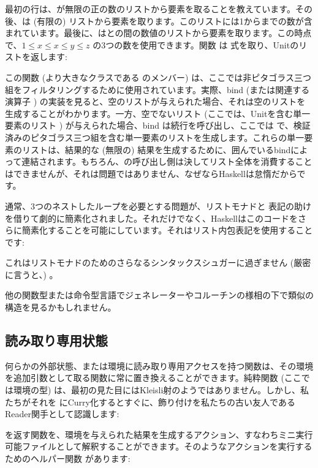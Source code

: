 最初の行は、が無限の正の数のリスト\code{{[}1..{]}}から要素を取ることを教えています。その後、は (有限の) リスト\code{{[}1..z{]}}から要素を取ります。このリストには1からまでの数が含まれています。最後に、はとの間の数値のリストから要素を取ります。この時点で、$1 \leqslant x \leqslant x \leqslant y \leqslant z$ の3つの数を使用できます。関数  は  式を取り、Unitのリストを返します: 

この関数 (より大きなクラスである  のメンバー) は、ここでは非ピタゴラス三つ組をフィルタリングするために使用されています。実際、bind (または関連する演算子 \code{>>}) の実装を見ると、空のリストが与えられた場合、それは空のリストを生成することがわかります。一方、空でないリスト (ここでは、Unitを含む単一要素のリスト \code{{[}(){]}}) が与えられた場合、bind は続行を呼び出し、ここでは  で、検証済みのピタゴラス三つ組を含む単一要素のリストを生成します。これらの単一要素のリストは、結果的な (無限の) 結果を生成するために、囲んでいるbindによって連結されます。もちろん、の呼び出し側は決してリスト全体を消費することはできませんが、それは問題ではありません、なぜならHaskellは怠惰だからです。

通常、3つのネストしたループを必要とする問題が、リストモナドと  表記の助けを借りて劇的に簡素化されました。それだけでなく、Haskellはこのコードをさらに簡素化することを可能にしています。それはリスト内包表記を使用することです: 

これはリストモナドのためのさらなるシンタックスシュガーに過ぎません (厳密に言うと、) 。

他の関数型または命令型言語でジェネレーターやコルーチンの様相の下で類似の構造を見るかもしれません。

\subsection{読み取り専用状態}

何らかの外部状態、または環境に読み取り専用アクセスを持つ関数は、その環境を追加引数として取る関数に常に置き換えることができます。純粋関数  (ここで  は環境の型) は、最初の見た目にはKleisli射のようではありません。しかし、私たちがそれを
 にCurry化するとすぐに、飾り付けを私たちの古い友人であるReader関手として認識します: 

 を返す関数を、環境を与えられた結果を生成するアクション、すなわちミニ実行可能ファイルとして解釈することができます。そのようなアクションを実行するためのヘルパー関数  があります: 

